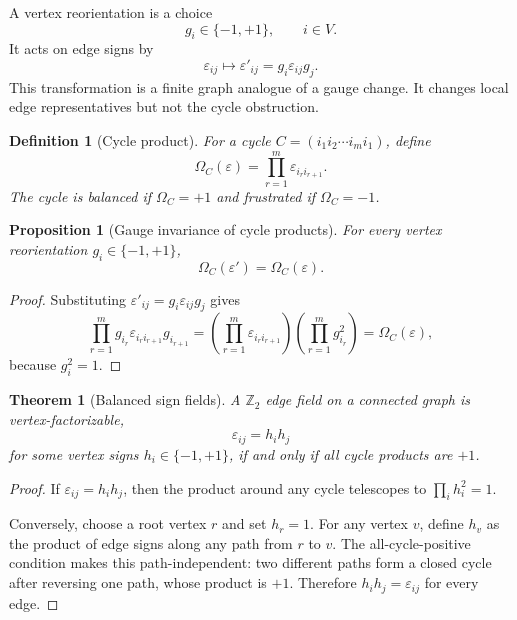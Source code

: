 \documentclass[11pt]{article}
\newtheorem{definition}{Definition}
\newtheorem{proposition}{Proposition}
\newtheorem{theorem}{Theorem}
\begin{document}
A vertex reorientation is a choice
\begin{equation}
 g_i\in\{-1,+1\},\qquad i\in V.
\end{equation}
It acts on edge signs by
\begin{equation}
 \varepsilon_{ij}\longmapsto \varepsilon'_{ij}=g_i\varepsilon_{ij}g_j.
\end{equation}
This transformation is a finite graph analogue of a gauge change. It changes local edge representatives but not the cycle obstruction.

\begin{definition}[Cycle product]
For a cycle $C=(i_1i_2\cdots i_m i_1)$, define
\begin{equation}
 \Omega_C(\varepsilon)=\prod_{r=1}^{m}\varepsilon_{i_r i_{r+1}}.
\end{equation}
The cycle is balanced if $\Omega_C=+1$ and frustrated if $\Omega_C=-1$.
\end{definition}

\begin{proposition}[Gauge invariance of cycle products]
For every vertex reorientation $g_i\in\{-1,+1\}$,
\begin{equation}
 \Omega_C(\varepsilon')=\Omega_C(\varepsilon).
\end{equation}
\end{proposition}

\begin{proof}
Substituting $\varepsilon'_{ij}=g_i\varepsilon_{ij}g_j$ gives
\begin{equation}
 \prod_{r=1}^{m}g_{i_r}\varepsilon_{i_r i_{r+1}}g_{i_{r+1}}
 =\left(\prod_{r=1}^{m}\varepsilon_{i_r i_{r+1}}\right)
  \left(\prod_{r=1}^{m}g_{i_r}^{2}\right)
 =\Omega_C(\varepsilon),
\end{equation}
because $g_i^2=1$.
\end{proof}

\begin{theorem}[Balanced sign fields]
A $\mathbb Z_2$ edge field on a connected graph is vertex-factorizable,
\begin{equation}
 \varepsilon_{ij}=h_i h_j
\end{equation}
for some vertex signs $h_i\in\{-1,+1\}$, if and only if all cycle products are $+1$.
\end{theorem}

\begin{proof}
If $\varepsilon_{ij}=h_i h_j$, then the product around any cycle telescopes to $\prod_i h_i^2=1$.

Conversely, choose a root vertex $r$ and set $h_r=1$. For any vertex $v$, define $h_v$ as the product of edge signs along any path from $r$ to $v$. The all-cycle-positive condition makes this path-independent: two different paths form a closed cycle after reversing one path, whose product is $+1$. Therefore $h_i h_j=\varepsilon_{ij}$ for every edge.
\end{proof}
\end{document}

